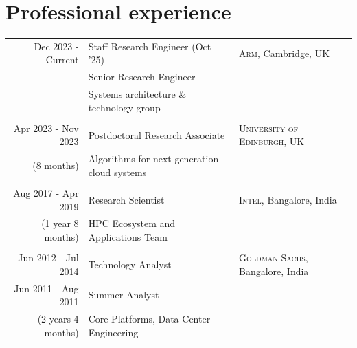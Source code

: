 \documentclass[a4paper,10pt]{article} %
\begin{document}

\section{Professional experience}

\begin{tabular}{r|p{6cm}l}
Dec 2023 - Current & Staff Research Engineer (Oct '25)& \textsc{Arm}, Cambridge, UK\\
& Senior Research Engineer& \\
& \footnotesize{Systems architecture \& technology group} & \\
& &\\
Apr 2023 - Nov 2023 & Postdoctoral Research Associate & \textsc{University of Edinburgh}, UK \\
{\footnotesize(8 months)} & \footnotesize{Algorithms for next generation cloud systems} & \\
& & \\
Aug 2017 - Apr 2019 & Research Scientist & \textsc{Intel}, Bangalore, India \\
{\footnotesize(1 year 8 months)} & \footnotesize{HPC Ecosystem and Applications Team} &\\
& & \\

Jun 2012 - Jul 2014 & Technology Analyst & \textsc{Goldman Sachs}, Bangalore, India \\



Jun 2011 - Aug 2011 & Summer Analyst &\\
{\footnotesize (2 years 4 months)} & \footnotesize{Core Platforms, Data Center Engineering}&\\ 



\end{tabular}
\end{document}
